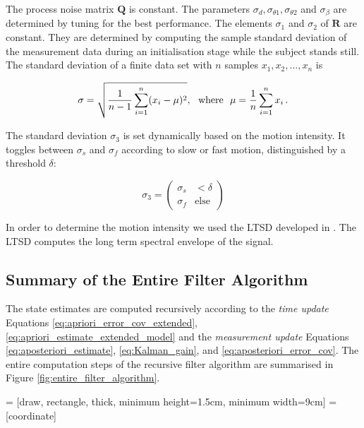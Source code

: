 \noindent
The process noise matrix $\mathbf{Q}$ is constant. The parameters $\sigma_d, \sigma_{\theta 1}, \sigma_{\theta 2}$ and $\sigma_{\beta}$ are determined by tuning for the best performance. The elements $\sigma_1$ and $\sigma_2$ of $\mathbf{R}$ are constant. They are determined by computing the sample standard deviation of the measurement data during an initialisation stage while the subject stands still. The standard deviation of a finite data set with $n$ samples $x_1, x_2, \dots, x_n$ is

\begin{equation}
  \sigma = \sqrt{\frac{1}{n-1} \sum_{i=1}^n (x_i - \mu)^2}, {\rm \ \ where\ \ } \mu = \frac{1}{n} \sum_{i=1}^n x_i\,.
\end{equation}

\noindent
The standard deviation $\sigma_3$ is set dynamically based on the motion intensity. It toggles between $\sigma_s$ and $\sigma_f$ according to slow or fast motion, distinguished by a threshold $\delta$:

\begin{equation}
  \sigma_3 = \begin{pmatrix}
  	\sigma_s & < \delta\\
  	\sigma_f & \mbox{else}
  \end{pmatrix}
\end{equation}

In order to determine the motion intensity we used the \gls{LTSD} developed in \cite{olivares_vicente_gaitwatch_2013}. The \gls{LTSD} computes the long term spectral envelope of the signal.

\subsection{Summary of the Entire Filter Algorithm}

The state estimates are computed recursively according to the \emph{time update} Equations \ref{eq:apriori_error_cov_extended}, \ref{eq:apriori_estimate_extended_model} and the \emph{measurement update} Equations \ref{eq:aposteriori_estimate}, \ref{eq:Kalman_gain}, and \ref{eq:aposteriori_error_cov}. The entire computation steps of the recursive filter algorithm are summarised in Figure \ref{fig:entire_filter_algorithm}.

 = [draw, rectangle, thick, 
    minimum height=1.5cm, minimum width=9cm]
 = [coordinate]

